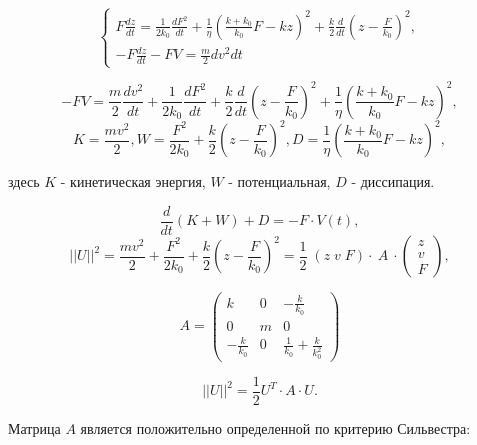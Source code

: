 \documentclass[a4paper,14pt,russian]{extreport}
\numberwithin{figure}{section}
\begin{document}
\begin{equation}
  \begin{cases}
      \displaystyle F \frac {dz} {dt} = \frac {1} {2 k_0} \frac {dF^2} {dt} + \frac {1} {\eta} (\frac {k+k_0} {k_0} F - kz)^2 + \frac {k} {2} \frac {d} {dt} (z-\frac {F} {k_0} )^2, \\
      -F\frac {dz} {dt} - FV = \frac {m} {2} {dv^2} {dt}
  \end{cases}
\end{equation}

\begin{equation}
  -FV= \frac {m} {2} \frac {dv^2} {dt} + \frac {1} {2k_0} \frac {dF^2} {dt} + \frac {k} {2} \frac {d} {dt} (z-\frac {F} {k_0})^2 + \frac {1} {\eta} (\frac{k+k_0} {k_0}F-kz)^2,
\end{equation}
\begin{equation}
  K=\frac {mv^2} {2}, W=\frac {F^2} {2k_0}+\frac {k} {2} (z-\frac{F} {k_0})^2, D=\frac {1} {\eta} (\frac {k+k_0}{k_0}F-kz)^2,
\end{equation}

здесь $K$ - кинетическая энергия, $W$ - потенциальная, $D$ - диссипация.

\begin{equation}  
  \frac {d} {dt}(K+W)+D=-F\cdot V(t),
\end{equation}
\begin{equation}
  ||U||^2=\frac {mv^2}{2}+\frac {F^2} {2k_0}+\frac {k} {2} (z-\frac{F}{k_0})^2=\frac {1} {2}\; (z \; v \; F)\cdot \: A \: \cdot \begin{pmatrix}z \\v \\ F \end{pmatrix},
\end{equation}

\begin{equation}
  A=\begin{pmatrix}
  k& 0  & -\frac{k}{k_0}\\
  0 & m  & 0\\
  
  
  -\frac {k}{k_0} & 0  & \frac {1}{k_0}+\frac{k}{k_0^2}
  \end{pmatrix}
\end{equation}


\begin{equation}
  ||U||^2 = \frac {1} {2} U^{T} \cdot A \cdot U.
\end{equation}

Матрица $A$ является положительно определенной по критерию Сильвестра: 
\end{document}
